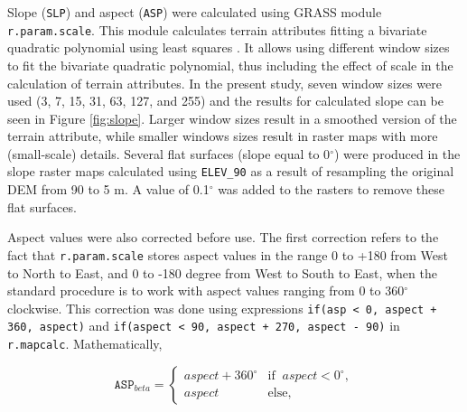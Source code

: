 Slope (\texttt{SLP}) and aspect (\texttt{ASP}) were calculated using GRASS module \texttt{r.param.scale}. This module calculates terrain attributes fitting a bivariate quadratic polynomial using least squares \cite{Wood1996}. It allows using different window sizes to fit the bivariate quadratic polynomial, thus including the effect of scale in the calculation of terrain attributes. In the present study, seven window sizes were used (3, 7, 15, 31, 63, 127, and 255) and the results for calculated slope can be seen in Figure \ref{fig:slope}. Larger window sizes result in a smoothed version of the terrain attribute, while smaller windows sizes result in raster maps with more (small-scale) details. Several flat surfaces (slope equal to 0$^\circ$) were produced in the slope raster maps calculated using \texttt{ELEV\_90} as a result of resampling the original DEM from 90 to 5 m. A value of 0.1$^\circ$ was added to the rasters to remove these flat surfaces.


Aspect values were also corrected before use. The first correction refers to the fact that \texttt{r.param.scale} stores aspect values in the range 0 to +180 from West to North to East, and 0 to -180 degree from West to South to East, when the standard procedure is to work with aspect values ranging from 0 to 360$^\circ$ clockwise. This correction was done using expressions \texttt{if(asp < 0, aspect + 360, aspect)} and \texttt{if(aspect < 90, aspect + 270, aspect - 90)} in \texttt{r.mapcalc}. Mathematically,

\begin{equation}
  \texttt{ASP}_{beta} =
  \begin{cases}
    aspect + 360^\circ & \text{if}\;\; aspect < 0^\circ, \\
    aspect             & \text{else},
  \end{cases}
\end{equation}

